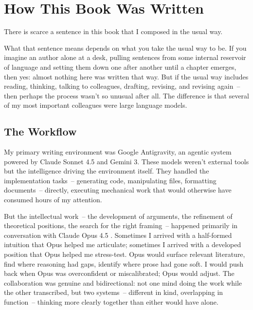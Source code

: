 \chapter{How This Book Was Written}
\label{app:how-written}

There is scarce a sentence in this book that I composed in the usual way.

What that sentence means depends on what you take the usual way to be. If you imagine an author alone at a desk, pulling sentences from some internal reservoir of language and setting them down one after another until a chapter emerges, then yes: almost nothing here was written that way. But if the usual way includes reading, thinking, talking to colleagues, drafting, revising, and revising again~-- then perhaps the process wasn't so unusual after all. The difference is that several of my most important colleagues were large language models.

\section*{The Workflow}

My primary writing environment was Google Antigravity, an agentic system powered by Claude Sonnet 4.5 and Gemini 3. These models weren't external tools but the intelligence driving the environment itself. They handled the implementation tasks~-- generating code, manipulating files, formatting documents~-- directly, executing mechanical work that would otherwise have consumed hours of my attention.

But the intellectual work~-- the development of arguments, the refinement of theoretical positions, the search for the right framing~-- happened primarily in conversation with Claude Opus 4.5 \autocite{reynolds2025supplementary}. Sometimes I arrived with a half-formed intuition that Opus helped me articulate; sometimes I arrived with a developed position that Opus helped me stress-test. Opus would surface relevant literature, find where reasoning had gaps, identify where prose had gone soft. I would push back when Opus was overconfident or miscalibrated; Opus would adjust. The collaboration was genuine and bidirectional: not one mind doing the work while the other transcribed, but two systems~-- different in kind, overlapping in function~-- thinking more clearly together than either would have alone.

